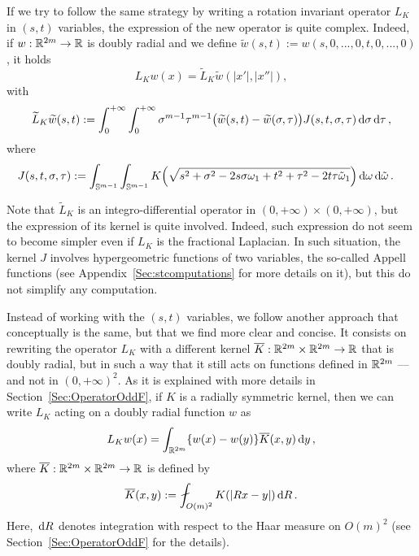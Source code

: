  If we try to follow the same strategy by writing a rotation invariant operator $L_K$ in $(s,t)$ variables, the expression of the new operator is quite complex. Indeed, if $w:\mathbb{R}^{2m} \to \mathbb{R}$ is doubly radial and we define $\widetilde{w}(s,t) := w(s,0,...,0,t,0,...,0)$, it holds
$$ L_Kw(x) = \widetilde{L}_K \widetilde{w} (|x'|,|x''|), $$
with
\begin{equation}
	\label{Eq:L_K-st}
	\widetilde{L}_K \widetilde{w} (s,t) := \int_0^{+\infty}  \int_0^{+\infty} \sigma^{m-1} \tau^{m-1} \big(\widetilde{w}(s,t) - \widetilde{w}(\sigma, \tau)\big) J(s,t,\sigma, \tau)  \,\mathrm{d} \sigma\,\mathrm{d} \tau\,,
\end{equation}
where
\begin{align*}
J(s,t,\sigma, \tau) &:= \int_{\mathbb{S}^{m-1}}  \int_{\mathbb{S}^{m-1}} K\Big( \sqrt{s^2+\sigma^2- 2 s \sigma \omega_1 + t^2 + \tau^2 - 2t \tau\tilde\omega_1}\Big) \,\mathrm{d} \omega \,\mathrm{d} \tilde\omega\,.
\end{align*}

Note that $\widetilde{L}_K$ is an integro-differential operator in $(0,+\infty)\times(0,+\infty)$, but the expression of its kernel is quite involved. Indeed, such expression do not seem to become simpler even if $L_K$ is the fractional Laplacian. In such situation, the kernel $J$ involves hypergeometric functions of two variables, the so-called Appell functions (see Appendix~\ref{Sec:stcomputations} for more details on it), but this do not simplify any computation. 



Instead of working with the $(s,t)$ variables, we follow another approach that conceptually is the same, but that we find more clear and concise. It consists on rewriting the operator $L_K$ with a different kernel $\overline{K} : \mathbb{R}^{2m}\times \mathbb{R}^{2m} \to \mathbb{R}$ that is doubly radial, but in such a way that it still acts on functions defined in $\mathbb{R}^{2m}$ ---and not in $(0,+\infty)^2$. As it is explained with more details in Section~\ref{Sec:OperatorOddF}, if $K$ is a radially symmetric kernel, then we can write $L_K$ acting on a doubly radial function $w$ as
\begin{equation}
\label{Eq:L_KWithKbar}
L_K w(x) = \int_{\mathbb{R}^{2m}} \{w(x) - w(y)\} \overline{K}(x,y) \,\mathrm{d} y\,,
\end{equation}
where $\overline{K} : \mathbb{R}^{2m}\times \mathbb{R}^{2m} \to \mathbb{R}$ is defined by
\begin{equation}
\label{Eq:KbarDef'}
\overline{K}(x,y) := \average_{O(m)^2} K(|Rx - y|)\d R\,.
\end{equation}
Here, $\,\mathrm{d} R$ denotes integration with respect to the Haar measure on $O(m)^2$ (see Section~\ref{Sec:OperatorOddF} for the details).

